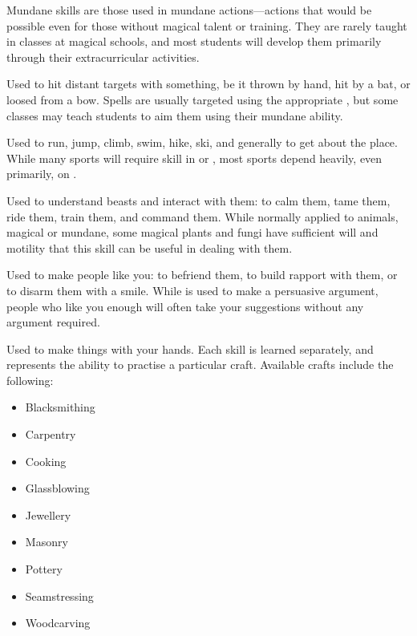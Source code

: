Mundane skills are those used in mundane actions---actions that would be possible even for those without magical talent or training.
They are rarely taught in classes at magical schools, and most students will develop them primarily through their extracurricular activities.


Used to hit distant targets with something, be it thrown by hand, hit by a bat, or loosed from a bow.
Spells are usually targeted using the appropriate {\magicskill}, but some classes may teach students to aim them using their mundane ability. %


Used to run, jump, climb, swim, hike, ski, and generally to get about the place.
While many sports will require skill in  or , most sports depend heavily, even primarily, on .


Used to understand beasts and interact with them: to calm them, tame them, ride them, train them, and command them.
While normally applied to animals, magical or mundane, some magical plants and fungi have sufficient will and motility that this skill can be useful in dealing with them.


Used to make people like you: to befriend them, to build rapport with them, or to disarm them with a smile.
While  is used to make a persuasive argument, people who like you enough will often take your suggestions without any argument required.


Used to make things with your hands.
Each  skill is learned separately, and represents the ability to practise a particular craft.
Available crafts include the following:
\begin{itemize}
	\item Blacksmithing
	\item Carpentry
	\item Cooking
	\item Glassblowing
	\item Jewellery
	\item Masonry
	\item Pottery
	\item Seamstressing
	\item Woodcarving
\end{itemize}

